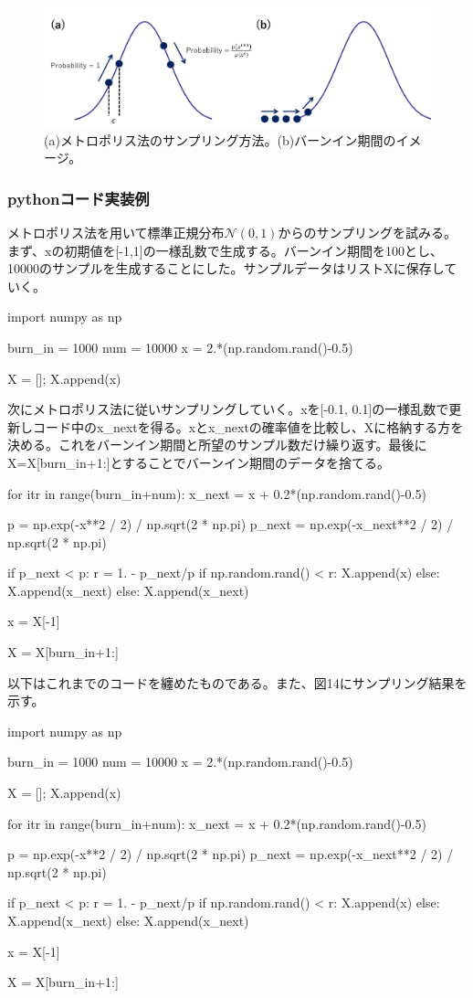 \documentclass[dvipdfmx, 9pt, a4paper]{jsarticle}
\begin{document}
\begin{figure}[t]
\begin{center}
\includegraphics[width=12cm]{"fig13.png"}
\caption{(a)メトロポリス法のサンプリング方法。(b)バーンイン期間のイメージ。}
\end{center}
\end{figure}

\subsubsection{pythonコード実装例}
メトロポリス法を用いて標準正規分布$\mathcal{N}(0, 1)$からのサンプリングを試みる。まず、xの初期値を[-1,1]の一様乱数で生成する。バーンイン期間を100とし、10000のサンプルを生成することにした。サンプルデータはリストXに保存していく。\bigskip
\begin{python}
import numpy as np

burn_in = 1000
num = 10000
x = 2.*(np.random.rand()-0.5)

X = []; X.append(x)
\end{python}\bigskip
次にメトロポリス法に従いサンプリングしていく。xを[-0.1, 0.1]の一様乱数で更新しコード中のx\_nextを得る。xとx\_nextの確率値を比較し、Xに格納する方を決める。これをバーンイン期間と所望のサンプル数だけ繰り返す。最後にX=X[burn\_in+1:]とすることでバーンイン期間のデータを捨てる。\bigskip
\begin{python}
for itr in range(burn_in+num):
	x_next = x + 0.2*(np.random.rand()-0.5)

	p = np.exp(-x**2 / 2) / np.sqrt(2 * np.pi)
	p_next = np.exp(-x_next**2 / 2) / np.sqrt(2 * np.pi)

	if p_next < p:
		r = 1. - p_next/p
		if np.random.rand() < r:
			X.append(x)
		else:
			X.append(x_next)
	else:
		X.append(x_next)

	x = X[-1]

X = X[burn_in+1:]
\end{python}\bigskip
以下はこれまでのコードを纏めたものである。また、図14にサンプリング結果を示す。\bigskip
\begin{python}
import numpy as np

burn_in = 1000
num = 10000
x = 2.*(np.random.rand()-0.5)

X = []; X.append(x)

for itr in range(burn_in+num):
	x_next = x + 0.2*(np.random.rand()-0.5)

	p = np.exp(-x**2 / 2) / np.sqrt(2 * np.pi)
	p_next = np.exp(-x_next**2 / 2) / np.sqrt(2 * np.pi)

	if p_next < p:
		r = 1. - p_next/p
		if np.random.rand() < r:
			X.append(x)
		else:
			X.append(x_next)
	else:
		X.append(x_next)

	x = X[-1]

X = X[burn_in+1:]
\end{python}
\end{document}
